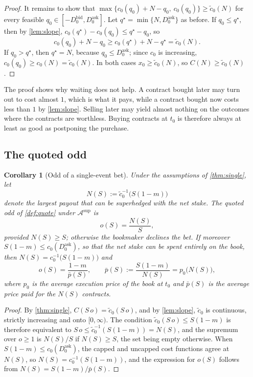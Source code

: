 \documentclass[11pt,a4paper]{article}
\theoremstyle{plain}
\newtheorem{corollary}[theorem]{Corollary}
\theoremstyle{definition}
\theoremstyle{remark}
\newcommand{\1}{\mathbf{1}}
\begin{document}
\begin{proof}
It remains to show that $\max\{c_0(q_0) + N - q_0,\ c_0(q_0)\}\geq\tilde c_0(N)$ for every feasible $q_0\in[-D^{\mathrm{bid}}_0, D^{\mathrm{ask}}_0]$. Let $q^\star = \min\{N,D^{\mathrm{ask}}_0\}$ as before. If $q_0\leq q^\star$, then by \cref{lem:slope}, $c_0(q^\star) - c_0(q_0)\leq q^\star - q_0$, so
\[
c_0(q_0) + N - q_0 \geq c_0(q^\star) + N - q^\star = \tilde c_0(N).
\]
If $q_0>q^\star$, then $q^\star = N$, because $q_0\leq D^{\mathrm{ask}}_0$; since $c_0$ is increasing, $c_0(q_0)\geq c_0(N) = \tilde c_0(N)$. In both cases $x_0\geq\tilde c_0(N)$, so $C(N)\geq\tilde c_0(N)$.
\end{proof}

The proof shows why waiting does not help. A contract bought later may turn out to cost almost $1$, which is what it pays, while a contract bought now costs less than $1$ by \cref{lem:slope}. Selling later may yield almost nothing on the outcomes where the contracts are worthless. Buying contracts at $t_0$ is therefore always at least as good as postponing the purchase.

\subsection{The quoted odd}

\begin{corollary}[Odd of a single-event bet]
\label{cor:single-odd}
Under the assumptions of \cref{thm:single}, let
\[
N(S) := \tilde c_0^{-1}\bigl(S(1-m)\bigr)
\]
denote the largest payout that can be superhedged with the net stake. The quoted odd of \cref{def:quote} under $\mathcal{A}^{\mathrm{sup}}$ is
\[
o(S) = \frac{N(S)}{S},
\]
provided $N(S)\geq S$; otherwise the bookmaker declines the bet. If moreover $S(1-m)\leq c_0(D^{\mathrm{ask}}_0)$, so that the net stake can be spent entirely on the book, then $N(S) = c_0^{-1}\bigl(S(1-m)\bigr)$ and
\[
o(S) = \frac{1-m}{\bar p(S)},\qquad \bar p(S) := \frac{S(1-m)}{N(S)} = p_0\bigl(N(S)\bigr),
\]
where $p_0$ is the average execution price of the book at $t_0$ and $\bar p(S)$ is the average price paid for the $N(S)$ contracts.
\end{corollary}

\begin{proof}
By \cref{thm:single}, $C(S\,o) = \tilde c_0(S\,o)$, and by \cref{lem:slope}, $\tilde c_0$ is continuous, strictly increasing and onto $[0,\infty)$. The condition $\tilde c_0(S\,o)\leq S(1-m)$ is therefore equivalent to $S\,o\leq\tilde c_0^{-1}(S(1-m)) = N(S)$, and the supremum over $o\geq 1$ is $N(S)/S$ if $N(S)\geq S$, the set being empty otherwise. When $S(1-m)\leq c_0(D^{\mathrm{ask}}_0)$, the capped and uncapped cost functions agree at $N(S)$, so $N(S)=c_0^{-1}(S(1-m))$, and the expression for $o(S)$ follows from $N(S) = S(1-m)/\bar p(S)$.
\end{proof}
\end{document}
